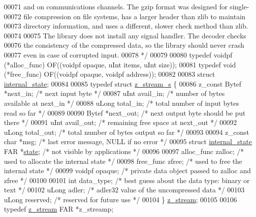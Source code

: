 \begin{DoxyCode}
00071 \textcolor{comment}{  and on communications channels.  The gzip format was designed for single-}
00072 \textcolor{comment}{  file compression on file systems, has a larger header than zlib to maintain}
00073 \textcolor{comment}{  directory information, and uses a different, slower check method than zlib.}
00074 \textcolor{comment}{}
00075 \textcolor{comment}{    The library does not install any signal handler.  The decoder checks}
00076 \textcolor{comment}{  the consistency of the compressed data, so the library should never crash}
00077 \textcolor{comment}{  even in case of corrupted input.}
00078 \textcolor{comment}{*/}
00079 
00080 \textcolor{keyword}{typedef} voidpf (*alloc\_func) OF((voidpf opaque, uInt items, uInt size));
00081 \textcolor{keyword}{typedef} void   (*free\_func)  OF((voidpf opaque, voidpf address));
00082 
00083 \textcolor{keyword}{struct }\hyperlink{structinternal__state}{internal\_state};
00084 
00085 \textcolor{keyword}{typedef} \textcolor{keyword}{struct }\hyperlink{structz__stream__s}{z\_stream\_s} \{
00086     z\_const Bytef *next\_in;     \textcolor{comment}{/* next input byte */}
00087     uInt     avail\_in;  \textcolor{comment}{/* number of bytes available at next\_in */}
00088     uLong    total\_in;  \textcolor{comment}{/* total number of input bytes read so far */}
00089 
00090     Bytef    *next\_out; \textcolor{comment}{/* next output byte should be put there */}
00091     uInt     avail\_out; \textcolor{comment}{/* remaining free space at next\_out */}
00092     uLong    total\_out; \textcolor{comment}{/* total number of bytes output so far */}
00093 
00094     z\_const \textcolor{keywordtype}{char} *msg;  \textcolor{comment}{/* last error message, NULL if no error */}
00095     \textcolor{keyword}{struct }\hyperlink{structinternal__state}{internal\_state} FAR *\hyperlink{structstate}{state}; \textcolor{comment}{/* not visible by applications */}
00096 
00097     alloc\_func zalloc;  \textcolor{comment}{/* used to allocate the internal state */}
00098     free\_func  zfree;   \textcolor{comment}{/* used to free the internal state */}
00099     voidpf     opaque;  \textcolor{comment}{/* private data object passed to zalloc and zfree */}
00100 
00101     \textcolor{keywordtype}{int}     data\_type;  \textcolor{comment}{/* best guess about the data type: binary or text */}
00102     uLong   adler;      \textcolor{comment}{/* adler32 value of the uncompressed data */}
00103     uLong   reserved;   \textcolor{comment}{/* reserved for future use */}
00104 \} \hyperlink{structz__stream__s}{z\_stream};
00105 
00106 \textcolor{keyword}{typedef} \hyperlink{structz__stream__s}{z\_stream} FAR *z\_streamp;

\end{DoxyCode}
